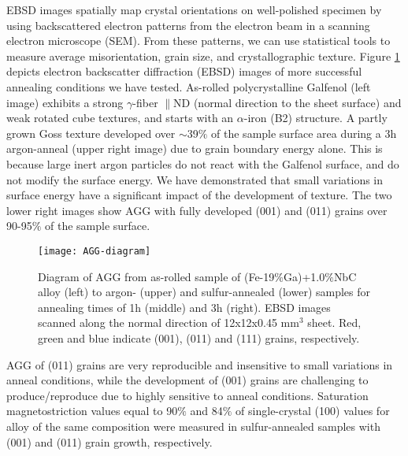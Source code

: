  EBSD images spatially map crystal orientations on well-polished specimen by using backscattered electron patterns from the electron beam in a scanning electron microscope (SEM). From these patterns, we can use statistical tools to measure average misorientation, grain size, and crystallographic texture. Figure \ref{fig:AGG-diagram} depicts electron backscatter diffraction (EBSD) images of more successful annealing conditions we have tested. As-rolled polycrystalline Galfenol (left image) exhibits a strong $\gamma$-fiber $ \parallel $ND (normal direction to the sheet surface) and weak rotated cube textures, and starts with an $\alpha$-iron (B2) structure. A partly grown Goss texture developed over $\sim$39$\%$ of the sample surface area during a 3h argon-anneal (upper right image) due to grain boundary energy alone. This is because large inert argon particles do not react with the Galfenol surface, and do not modify the surface energy. We have demonstrated that small variations in surface energy have a significant impact of the development of texture.\cite{Chun2010,Na2012b} The two lower right images show AGG with fully developed \hkl(001) and \hkl(011) grains over 90-95$ \% $ of the sample surface. 
\begin{figure}
	\centering
	\texttt{[image: AGG-diagram]}
	\caption{Diagram of AGG from as-rolled sample of (Fe-19$\%$Ga)+1.0$\%$NbC alloy (left) to argon- (upper) and sulfur-annealed (lower) samples for annealing times of 1h (middle) and 3h (right). EBSD images scanned along the normal direction of 12x12x0.45 mm$^{3}$ sheet. Red, green and blue indicate \hkl(001), \hkl(011) and \hkl(111) grains, respectively. 
	}
	\label{fig:AGG-diagram}	
\end{figure}
 AGG of (011) grains are very reproducible and insensitive to small variations in anneal conditions, while the development of (001) grains are challenging to produce/reproduce due to highly sensitive to anneal conditions. Saturation magnetostriction values equal to 90$ \% $ and 84$ \% $ of single-crystal \hkl(100) values for alloy of the same composition were measured in sulfur-annealed samples with \hkl(001) and \hkl(011) grain growth, respectively.  

